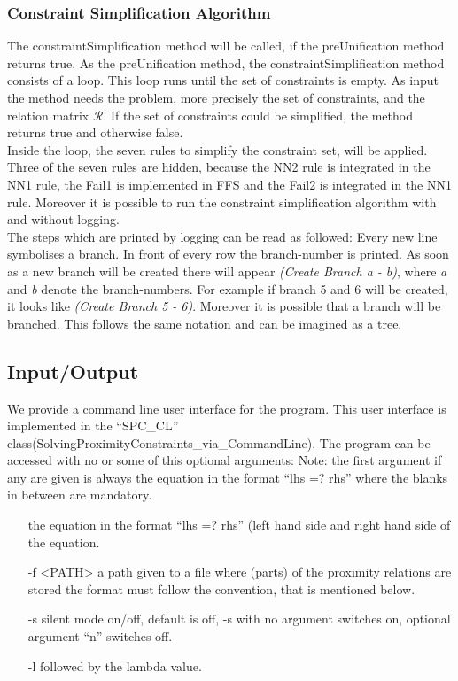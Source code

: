 \documentclass{article}
\begin{document}

\subsubsection{Constraint Simplification Algorithm}
The constraintSimplification method will be called, if the preUnification method returns true. As the preUnification method, the constraintSimplification method consists of a loop. This loop runs until the set of constraints is empty. As input the method needs the problem, more precisely the set of constraints, and the relation matrix \(\mathcal{R}\). If the set of constraints could be simplified, the method returns true and otherwise false.\\
Inside the loop, the seven rules to simplify the constraint set, will be applied. Three of the seven rules are hidden, because the NN2 rule is integrated in the NN1 rule, the Fail1 is implemented in FFS and the Fail2 is integrated in the NN1 rule. Moreover it is possible to run the constraint simplification algorithm with and without logging. \\
The steps which are printed by logging can be read as followed: 
Every new line symbolises a branch. In front of every row the branch-number is printed.
As soon as a new branch will be created there will appear \textit{(Create Branch a - b)}, where \textit{a} and \textit{b} denote the branch-numbers. For example if branch 5 and 6 will be created, it looks like \textit{(Create Branch 5 - 6)}. Moreover it is possible that a branch will be branched. This follows the same notation and can be imagined as a tree.


\subsection{Input/Output}

We provide a command line user interface for the program. This user interface is implemented in the ``SPC\_CL'' class(SolvingProximityConstraints\_via\_CommandLine). The program can be accessed with no or some of this optional arguments:
Note: the first argument if any are given is always the equation in the format ``lhs =? rhs'' where the blanks in between are mandatory.
\begin{itemize}
	\item [] the equation in the format ``lhs =? rhs'' (left hand side and right hand side of the equation.
	\item [-f] <PATH> a path given to a file where (parts) of the proximity relations are stored the format must follow the convention, that is mentioned below.
	\item [-s] silent mode on/off, default is off, -s with no argument switches on, optional argument ``n'' switches off.
	\item [-l] followed by the lambda value.
\end{itemize}
\end{document}
